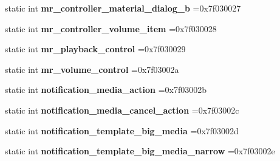 \begin{DoxyCompactItemize}
\item 
\mbox{\label{classandroid_1_1support_1_1design_1_1R_1_1layout_a7e3f35921cbd7f3d280736de4aa87639}} 
static int {\bfseries mr\+\_\+controller\+\_\+material\+\_\+dialog\+\_\+b} =0x7f030027
\item 
\mbox{\label{classandroid_1_1support_1_1design_1_1R_1_1layout_a0e7be519352bec3fd4034b02463198c9}} 
static int {\bfseries mr\+\_\+controller\+\_\+volume\+\_\+item} =0x7f030028
\item 
\mbox{\label{classandroid_1_1support_1_1design_1_1R_1_1layout_a487bcbdf2373f5ea021b13dde50fea75}} 
static int {\bfseries mr\+\_\+playback\+\_\+control} =0x7f030029
\item 
\mbox{\label{classandroid_1_1support_1_1design_1_1R_1_1layout_a5f687c57e198f1709533eccb9459cf88}} 
static int {\bfseries mr\+\_\+volume\+\_\+control} =0x7f03002a
\item 
\mbox{\label{classandroid_1_1support_1_1design_1_1R_1_1layout_ab5f39e2aa6763c8e0d240edc1c5247f1}} 
static int {\bfseries notification\+\_\+media\+\_\+action} =0x7f03002b
\item 
\mbox{\label{classandroid_1_1support_1_1design_1_1R_1_1layout_a5679fcd4f6df0f029020dac17c6b06cd}} 
static int {\bfseries notification\+\_\+media\+\_\+cancel\+\_\+action} =0x7f03002c
\item 
\mbox{\label{classandroid_1_1support_1_1design_1_1R_1_1layout_a93365e9d27549f792a2455b9980f9e5d}} 
static int {\bfseries notification\+\_\+template\+\_\+big\+\_\+media} =0x7f03002d
\item 
\mbox{\label{classandroid_1_1support_1_1design_1_1R_1_1layout_af9ec94b1e280fb281991f275c882f285}} 
static int {\bfseries notification\+\_\+template\+\_\+big\+\_\+media\+\_\+narrow} =0x7f03002e
\item 

\end{DoxyCompactItemize}

